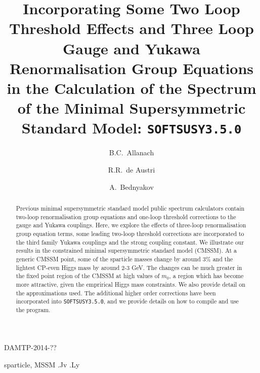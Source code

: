 \documentclass[final,3p,times,pdflatex]{elsarticle}
\begin{document}
\begin{frontmatter}

\begin{flushright}
DAMTP-2014-??
\end{flushright}

\title{Incorporating Some Two Loop Threshold Effects and Three Loop Gauge and
  Yukawa Renormalisation Group Equations in the Calculation of the Spectrum
  of the Minimal Supersymmetric Standard Model: {\tt SOFTSUSY3.5.0}}

\author[damtp]{B.C.~Allanach}
\author[valencia]{R.R.~de Austri}
\author[dunba]{A.~Bednyakov}

\address[damtp]{DAMTP, CMS, University of Cambridge, Wilberforce road,
  Cambridge, CB3  0WA, United Kingdom}
\address[valencia]{Instituto de Física Corpuscular | Parque Científico,
  C/Catedrático José Beltrán, 2 | E-46980 Paterna, Spain} 
\address[dubna]{Joint Institute for Nuclear Research, 141980, Dubna, Russia}

\begin{abstract}
  Previous minimal supersymmetric standard model public spectrum calculators
  contain two-loop 
  renormalisation group equations and one-loop threshold corrections to the
  gauge and Yukawa couplings. Here, we explore the effects of three-loop
  renormalisation group equation terms, some leading two-loop threshold
  corrections are incorporated to the third family Yukawa couplings and the
  strong coupling constant.
  We illustrate our results in the constrained minimal supersymmetric standard
  model (CMSSM). 
  At a generic CMSSM point, some of the sparticle masses change by around
  3$\%$ and the 
  lightest CP-even Higgs mass by around 2-3 GeV. 
  The changes can be much greater in the fixed point region of the CMSSM at
  high values of $m_0$, a region which has become more attractive, given the
  emprirical Higgs mass constraints. 
  We also provide detail on the
  approximations used. The additional higher order corrections have been
  incorporated into {\tt SOFTSUSY3.5.0}, and we provide details on how to
  compile and use the program. 
\end{abstract}

\begin{keyword}
sparticle, 
MSSM
.Jv
.Ly
\end{keyword}
\end{frontmatter}
\end{document}
